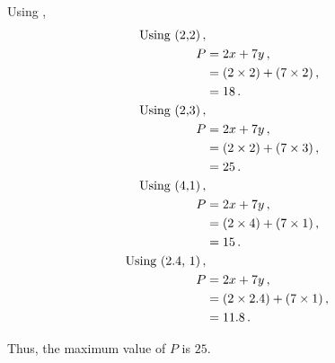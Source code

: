 \begin{subquestions}
\begin{subsubquestions}

\subsubquestion

Using ,
\begin{align}
	\text{Using (2,2)} \,, \nonumber \\
	P & = 2x + 7y \,, \nonumber \\
	& = (2 \times 2) + (7 \times 2) \,, \nonumber \\
	& = 18 \,. \\
	\text{Using (2,3)} \,, \nonumber \\
	P & = 2x + 7y \,, \nonumber \\
	& = (2 \times 2) + (7 \times 3) \,, \nonumber \\
	& = 25 \,. \\  \label{2012:q1:eqn:Profit}	  
	\text{Using (4,1)} \,, \nonumber \\
	P & = 2x + 7y \,, \nonumber \\
	& = (2 \times 4) + (7 \times 1) \,, \nonumber \\
	& = 15 \,.  \\
	\text{Using (2.4, 1)} \,, \nonumber \\
	P & = 2x + 7y \,, \nonumber \\
	& = (2 \times 2.4) + (7 \times 1) \,, \nonumber \\
	& = 11.8 \,. 
\end{align}

Thus, the maximum value of $P$ is $25$.

\end{subsubquestions}

\end{subquestions}

